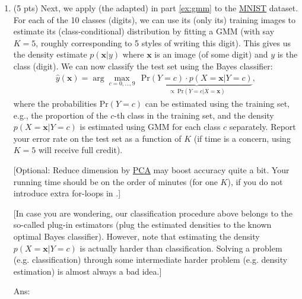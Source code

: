 \documentclass[10pt,letter,notitlepage]{article}
\newcommand{\xv}{\mathbf{x}}
\newcommand{\red}[1]{{\color{red}#1}}
\newcommand{\magenta}[1]{{\color{magenta}#1}}
\newcommand{\eg}{{e.g.}\xspace}
\newcommand{\ans}[1]{{\color{orange}\textsf{Ans}: #1}}
\newcounter{exercise}
\begin{document}
\begin{exercise}
\begin{enumerate}[label=\alph*)]
		
  \item (5 pts) Next, we apply (the adapted)  in part \ref{ex:gmm} to the \href{https://pytorch.org/vision/0.9/datasets.html#mnist}{\magenta{MNIST}} dataset. For each of the 10 classes (digits), we can use its (only its) training images to estimate its (class-conditional) distribution by fitting a GMM (with say $K=5$, roughly corresponding to 5 styles of writing this digit). This gives us the density estimate $p(\xv | y)$ where $\xv$ is an image (of some digit) and $y$ is the class (digit). We can now classify the test set using the Bayes classifier:
		\begin{align}
		\hat y(\xv) = \arg\max_{c = 0, \ldots, 9} ~~ \underbrace{\mathrm{Pr}(Y = c) \cdot p(X = \xv | Y = c)}_{\propto ~\mathrm{Pr}(Y=c | X=\xv)},
		\end{align}
		where the probabilities $\mathrm{Pr}(Y = c)$ can be estimated using the training set, \eg, the proportion of the $c$-th class in the training set, and the \red{density} $p(X = \xv | Y = c)$ is estimated using GMM for each class $c$ separately. Report your error rate on the test set as a function of $K$ (if time is a concern, using $K=5$ will receive  full credit). 

		[Optional: Reduce dimension by \href{https://en.wikipedia.org/wiki/Principal_component_analysis}{\magenta{PCA}} may boost accuracy quite a bit. Your running time should be on the order of minutes (for one $K$), if you do not introduce extra for-loops in .]
		
		[In case you are wondering, our classification procedure above belongs to the so-called plug-in estimators (plug the estimated densities to the known optimal Bayes classifier). However, note that estimating the density $p(X=\xv | Y = c)$ is actually harder than classification. Solving a problem (\eg classification) through some intermediate harder problem (\eg density estimation) is almost always a bad idea.]
		
		\ans{}
		

	\end{enumerate}	
\end{exercise}
\end{document}
